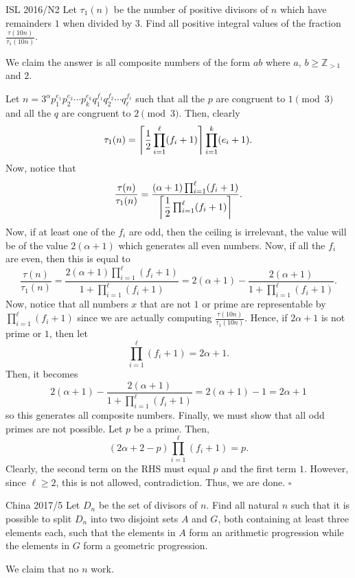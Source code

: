 \documentclass{article}
\begin{document}
\begin{problem}[3.7.19]{ISL 2016/N2}
Let $\tau_1(n)$ be the number of positive divisors of $n$ which have remainders $1$ when divided by $3$. Find all positive integral values of the fraction $\tfrac{\tau(10n)}{\tau_1(10n)}$.
\end{problem}

We claim the answer is all composite numbers of the form $ab$ where $a$, $b \ge \mathbb{Z}_{>1}$ and $2$.

Let $n = 3^{\alpha}p_1^{e_1}p_2^{e_2}\cdots p_k^{e_k}q_1^{f_1}q_2^{f_2}\cdots q_{\ell}^{f_{\ell}}$ such that all the $p$ are congruent to $1 \pmod{3}$ and all the $q$ are congruent to $2 \pmod{3}$. Then, clearly \[\tau_1(n) = \left\lceil \dfrac{1}{2}\prod_{i=1}^{\ell} (f_i+1) \right\rceil\prod_{i=1}^k (e_i+1).\] Now, notice that \[\dfrac{\tau(n)}{\tau_1(n)} = \dfrac{(\alpha+1)\prod_{i=1}^{\ell} (f_i+1)}{\left\lceil \dfrac{1}{2}\prod_{i=1}^{\ell} (f_i+1) \right\rceil}.\] Now, if at least one of the $f_i$ are odd, then the ceiling is irrelevant, the value will be of the value $2(\alpha+1)$ which generates all even numbers. Now, if all the $f_i$ are even, then this is equal to \[\dfrac{\tau(n)}{\tau_1(n)} = \dfrac{2(\alpha+1)\prod_{i=1}^{\ell} (f_i+1)}{1+\prod_{i=1}^{\ell} (f_i+1)} = 2(\alpha+1)-\dfrac{2(\alpha+1)}{1+\prod_{i=1}^{\ell} (f_i+1)}.\] Now, notice that all numbers $x$ that are not $1$ or prime are representable by $\prod_{i=1}^{\ell} (f_i+1)$ since we are actually computing $\tfrac{\tau(10n)}{\tau_1(10n)}$. Hence, if $2\alpha+1$ is not prime or $1$, then let \[\prod_{i=1}^{\ell} (f_i+1) = 2\alpha+1.\] Then, it becomes \[2(\alpha+1)-\dfrac{2(\alpha+1)}{1+\prod_{i=1}^{\ell} (f_i+1)} = 2(\alpha+1)-1 = 2\alpha+1\] so this generates all composite numbers. Finally, we must show that all odd primes are not possible. Let $p$ be a prime. Then, \[(2\alpha+2-p)\prod_{i=1}^{\ell} (f_i+1) = p.\] Clearly, the second term on the RHS must equal $p$ and the first term $1$. However, since $\ell \ge 2$, this is not allowed, contradiction. Thus, we are done. $\square$

\begin{problem}[3.7.20]{China 2017/5}
Let $D_n$ be the set of divisors of $n$. Find all natural $n$ such that it is possible to split $D_n$ into two disjoint sets $A$ and $G$, both containing at least three elements each, such that the elements in $A$ form an arithmetic progression while the elements in $G$ form a geometric progression.
\end{problem}

We claim that no $n$ work.
\end{document}
